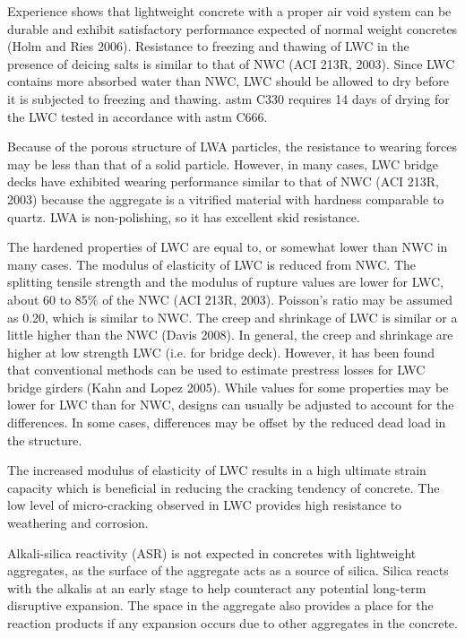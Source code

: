 Experience shows that lightweight concrete with a proper air void system can be durable and exhibit satisfactory
performance expected of normal weight concretes (Holm and Ries 2006). Resistance to freezing and thawing of
LWC in the presence of deicing salts is similar to that of NWC (ACI 213R, 2003). Since LWC contains more
absorbed water than NWC, LWC should be allowed to dry before it is subjected to freezing and thawing. \acrshort*{astm}
C330 requires 14 days of drying for the LWC tested in accordance with \acrshort*{astm} C666.

Because of the porous structure of LWA particles, the resistance to wearing forces may be less than that of a
solid particle. However, in many cases, LWC bridge decks have exhibited wearing performance similar to that of
NWC (ACI 213R, 2003) because the aggregate is a vitrified material with hardness comparable to quartz. LWA is
non-polishing, so it has excellent skid resistance.

The hardened properties of LWC are equal to, or somewhat lower than NWC in many cases. The modulus of
elasticity of LWC is reduced from NWC. The splitting tensile strength and the modulus of rupture values are lower
for LWC, about 60 to 85\% of the NWC (ACI 213R, 2003). Poisson’s ratio may be assumed as 0.20, which is similar
to NWC. The creep and shrinkage of LWC is similar or a little higher than the NWC (Davis 2008). In general, the
creep and shrinkage are higher at low strength LWC (i.e. for bridge deck). However, it has been found that
conventional methods can be used to estimate prestress losses for LWC bridge girders (Kahn and Lopez 2005).
While values for some properties may be lower for LWC than for NWC, designs can usually be adjusted to account
for the differences. In some cases, differences may be offset by the reduced dead load in the structure.

The increased modulus of elasticity of LWC results in a high ultimate strain capacity which is beneficial in
reducing the cracking tendency of concrete. The low level of micro-cracking observed in LWC provides high
resistance to weathering and corrosion.

Alkali-silica reactivity (ASR) is not expected in concretes with lightweight aggregates, as the surface of the
aggregate acts as a source of silica. Silica reacts with the alkalis at an early stage to help counteract any potential
long-term disruptive expansion. The space in the aggregate also provides a place for the reaction products if any
expansion occurs due to other aggregates in the concrete.


